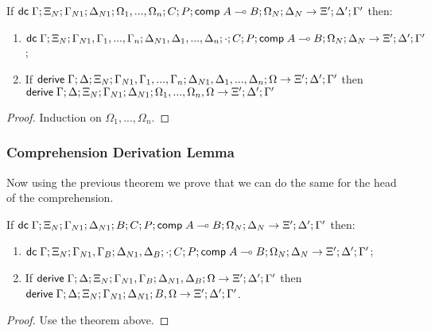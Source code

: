\begin{theorem}
   If $\mathsf{dc} \; \Gamma; \Xi_N; \Gamma_{N1}; \Delta_{N1}; \Omega_1, ..., \Omega_n; C; P; \mathsf{comp} \; A \multimap B; \Omega_N; \Delta_N \rightarrow \Xi'; \Delta'; \Gamma'$ then:
   
   \begin{enumerate}
      \item $\mathsf{dc} \; \Gamma; \Xi_N; \Gamma_{N1}, \Gamma_1, ..., \Gamma_n; \Delta_{N1}, \Delta_1, ..., \Delta_n; \cdot; C; P; \mathsf{comp} \; A \multimap B; \Omega_N; \Delta_N \rightarrow \Xi'; \Delta'; \Gamma'$;
      \item If $\mathsf{derive} \; \Gamma; \Delta; \Xi_N; \Gamma_{N1}, \Gamma_1, ..., \Gamma_n; \Delta_{N1}, \Delta_1, ..., \Delta_n; \Omega \rightarrow \Xi'; \Delta'; \Gamma'$ then $\mathsf{derive} \; \Gamma; \Delta; \Xi_N; \Gamma_{N1}; \Delta_{N1}; \Omega_1, ..., \Omega_n, \Omega \rightarrow \Xi'; \Delta'; \Gamma'$
   \end{enumerate}
\end{theorem}

\begin{proof}
   Induction on $\Omega_1, ..., \Omega_n$.
\end{proof}

\subsubsection{Comprehension Derivation Lemma}

Now using the previous theorem we prove that we can do the same for the head of the comprehension.

\begin{theorem}
   If $\mathsf{dc} \; \Gamma; \Xi_N; \Gamma_{N1}; \Delta_{N1}; B; C; P; \mathsf{comp} \; A \multimap B; \Omega_N; \Delta_N \rightarrow \Xi'; \Delta'; \Gamma'$ then:
   
   \begin{enumerate}
      \item $\mathsf{dc} \; \Gamma; \Xi_N; \Gamma_{N1}, \Gamma_B; \Delta_{N1}, \Delta_B; \cdot; C; P; \mathsf{comp} \; A \multimap B; \Omega_N; \Delta_N \rightarrow \Xi'; \Delta'; \Gamma'$;
      \item If $\mathsf{derive} \; \Gamma; \Delta; \Xi_N; \Gamma_{N1}, \Gamma_B; \Delta_{N1}, \Delta_B; \Omega \rightarrow \Xi'; \Delta'; \Gamma'$ then $\mathsf{derive} \; \Gamma; \Delta; \Xi_N; \Gamma_{N1}; \Delta_{N1}; B, \Omega \rightarrow \Xi'; \Delta'; \Gamma'$.
   \end{enumerate}
\end{theorem}

\begin{proof}
   Use the theorem above.
\end{proof}

